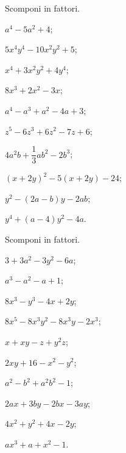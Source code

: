 \begin{esercizio}[\Ast]
 \label{ese:13.129}
 Scomponi in fattori.
 \begin{multicols}{2}
 \begin{enumeratea}
\item $a^{4}-5a^{2}+4$;
\item $5x^{4}y^{4}-10x^{2}y^{2}+5$;
\item $x^{4}+3x^{2}y^{2}+4y^{4}$;
\item $8x^{3}+2x^{2}-3x$;
\item $a^{4}-a^{3}+a^{2}-4a+3$;
\item $z^{5}-6z^{3}+6z^{2}-7z+6$;
\item $4a^{2}b+\dfrac{1}{3}ab^{2}-2b^{3}$;
\item $(x+2y)^{2}-5(x+2y)-24$;
\item $y^{2}-(2a-b)y-2ab$;
\item $y^{4}+(a-4)y^{2}-4a$.
 \end{enumeratea}
 \end{multicols}
\end{esercizio}
\pagebreak
\begin{esercizio}[\Ast]
 \label{ese:13.130}
 Scomponi in fattori.
 \begin{multicols}{2}
 \begin{enumeratea}
\item $3+3a^{2}-3y^{2}-6a$;
\item $a^{3}-a^{2}-a+1$;
\item $8x^{3}-y^{3}-4x+2y$;
\item $8x^{5}-8x^{3}y^{2}-8x^{3}y-2x^{3}$;
\item $x+xy-z+y^{2}z$;
\item $2xy+16-x^{2}-y^{2}$;
\item $a^{2}-b^{2}+a^{2}b^{2}-1$;
\item $2ax+3by-2bx-3ay$;
\item $4x^{2}+y^{2}+4x-2y$;
\item $ax^{3}+a+x^{2}-1$.
 \end{enumeratea}
 \end{multicols}
\end{esercizio}

